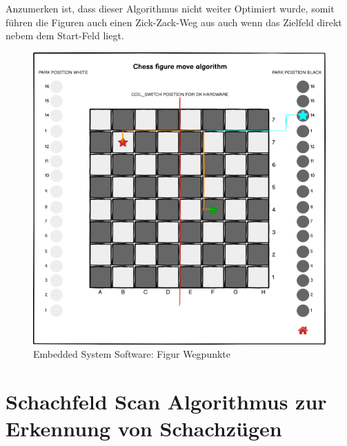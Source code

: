 Anzumerken ist, dass dieser Algorithmus nicht weiter Optimiert wurde,
somit führen die Figuren auch einen Zick-Zack-Weg aus auch wenn das
Zielfeld direkt nebem dem Start-Feld liegt.

\begin{figure}
\centering
\includegraphics{images/ATC_FigureMoveAlgorithm.png}
\caption{Embedded System Software: Figur Wegpunkte
\label{ATC_FigureMoveAlgorithm}}
\end{figure}

\hypertarget{schachfeld-scan-algorithmus-zur-erkennung-von-schachzuxfcgen}{%
\section{Schachfeld Scan Algorithmus zur Erkennung von
Schachzügen}\label{schachfeld-scan-algorithmus-zur-erkennung-von-schachzuxfcgen}}

